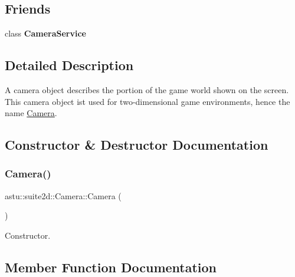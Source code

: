 \subsection*{Friends}
\begin{DoxyCompactItemize}
\item 
\mbox{\label{classastu_1_1suite2d_1_1Camera_aac0472369257ab50c0af61e5bc400473}} 
class {\bfseries Camera\+Service}
\end{DoxyCompactItemize}


\subsection{Detailed Description}
A camera object describes the portion of the game world shown on the screen. This camera object ist used for two-\/dimensional game environments, hence the name {\ttfamily \hyperlink{classastu_1_1suite2d_1_1Camera}{Camera}}. 

\subsection{Constructor \& Destructor Documentation}
\mbox{\label{classastu_1_1suite2d_1_1Camera_ab0b68d23b81551c747a03d4882a8473a}} 
\subsubsection{\texorpdfstring{Camera()}{Camera()}}
{\footnotesize\ttfamily astu\+::suite2d\+::\+Camera\+::\+Camera (\begin{DoxyParamCaption}{ }\end{DoxyParamCaption})}

Constructor. 

\subsection{Member Function Documentation}
\mbox{\label{classastu_1_1suite2d_1_1Camera_a92019ffd5becbde98ef768a2fc86da41}} 
